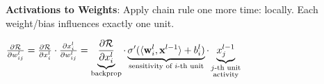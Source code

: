     \textbf{Activations to Weights}: Apply chain rule one more time: locally. Each weight/bias influences exactly one unit.
    
    $\frac{\partial\mathcal{R}}{\partial w^l_{ij}}=\frac{\partial\mathcal{R}}{\partial x^l_{i}}\cdot\frac{\partial x^l_i}{\partial w^l_{ij}}=\underbrace{\frac{\partial\mathcal{R}}{\partial x^l_{i}}}_{\text{backprop}}\cdot\underbrace{\sigma'(\langle\mathbf w^l_i,\mathbf x^{l-1}\rangle + b^l_i)}_{\text{sensitivity of } i\text{-th unit}}\cdot\underbrace{x^{l-1}_j}_{\substack{j\text{-th unit} \\ \text{activity}}}$
    
    
    